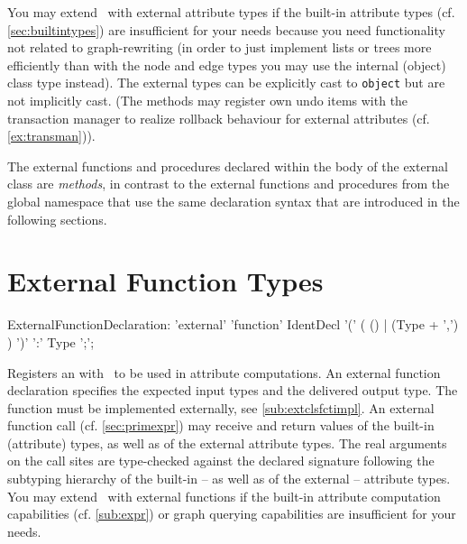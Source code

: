 You may extend \GrG~with external attribute types if the built-in attribute types (cf. \ref{sec:builtintypes}) are insufficient for your needs because you need functionality not related to graph-rewriting (in order to just implement lists or trees more efficiently than with the node and edge types you may use the internal (object) class type instead).
The external types can be explicitly cast to \texttt{object} but are not implicitly cast.
(The methods may register own undo items with the transaction manager to realize rollback behaviour for external attributes (cf. \ref{ex:transman})).

The external functions and procedures declared within the body of the external class are \emph{methods}, in contrast to the external functions and procedures from the global namespace that use the same declaration syntax that are introduced in the following sections.

\section{External Function Types}\label{sub:extfct}
\begin{rail}
  ExternalFunctionDeclaration: 'external' 'function' IdentDecl '(' ( () | (Type + ',') ) ')' ':' Type ';';
\end{rail}
Registers an  with \GrG~to be used in attribute computations.
An external function declaration specifies the expected input types and the delivered output type.
The function must be implemented externally, see \ref{sub:extclsfctimpl}.
An external function call (cf. \ref{sec:primexpr}) may receive and return values of the built-in (attribute) types, as well as of the external attribute types.
The real arguments on the call sites are type-checked against the declared signature following the subtyping hierarchy of the built-in -- as well as of the external -- attribute types.
You may extend \GrG~with external functions if the built-in attribute computation capabilities (cf. \ref{sub:expr}) or graph querying capabilities are insufficient for your needs.

